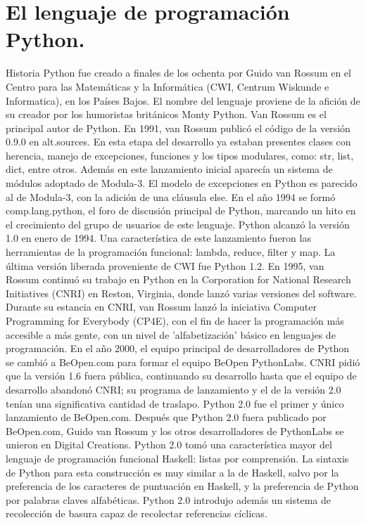 \documentclass[12pt]{article}
\begin{document}
\section{El lenguaje de programación Python.}

Historia
Python fue creado a finales de los ochenta por Guido van Rossum en el Centro para las Matemáticas y la Informática (CWI, Centrum Wiskunde e Informatica), en los Países Bajos.
El nombre del lenguaje proviene de la afición de su creador por los humoristas británicos Monty Python.
Van Rossum es el principal autor de Python.
En 1991, van Rossum publicó el código de la versión 0.9.0 en alt.sources. En esta etapa del desarrollo ya estaban presentes clases con herencia, manejo de excepciones, funciones y los tipos modulares, como: str, list, dict, entre otros. Además en este lanzamiento inicial aparecía un sistema de módulos adoptado de Modula-3. El modelo de excepciones en Python es parecido al de Modula-3, con la adición de una cláusula else. En el año 1994 se formó comp.lang.python, el foro de discusión principal de Python, marcando un hito en el crecimiento del grupo de usuarios de este lenguaje.
Python alcanzó la versión 1.0 en enero de 1994. Una característica de este lanzamiento fueron las herramientas de la programación funcional: lambda, reduce, filter y map.
La última versión liberada proveniente de CWI fue Python 1.2. En 1995, van Rossum continuó su trabajo en Python en la Corporation for National Research Initiatives (CNRI) en Reston, Virginia, donde lanzó varias versiones del software.
Durante su estancia en CNRI, van Rossum lanzó la iniciativa Computer Programming for Everybody (CP4E), con el fin de hacer la programación más accesible a más gente, con un nivel de 'alfabetización' básico en lenguajes de programación.
En el año 2000, el equipo principal de desarrolladores de Python se cambió a BeOpen.com para formar el equipo BeOpen PythonLabs. CNRI pidió que la versión 1.6 fuera pública, continuando su desarrollo hasta que el equipo de desarrollo abandonó CNRI; su programa de lanzamiento y el de la versión 2.0 tenían una significativa cantidad de traslapo.​ Python 2.0 fue el primer y único lanzamiento de BeOpen.com. Después que Python 2.0 fuera publicado por BeOpen.com, Guido van Rossum y los otros desarrolladores de PythonLabs se unieron en Digital Creations.
Python 2.0 tomó una característica mayor del lenguaje de programación funcional Haskell: listas por comprensión. La sintaxis de Python para esta construcción es muy similar a la de Haskell, salvo por la preferencia de los caracteres de puntuación en Haskell, y la preferencia de Python por palabras claves alfabéticas. Python 2.0 introdujo además un sistema de recolección de basura capaz de recolectar referencias cíclicas.
\end{document}

